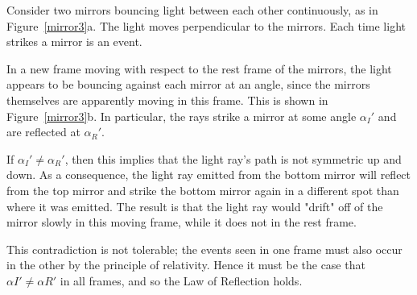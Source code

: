 \documentclass[11pt]{article}
\begin{document}
\begin{sidebox}[Lemma 1]
Consider two mirrors bouncing light between each other continuously, as in Figure~\ref{mirror3}a. The light moves perpendicular to the mirrors. Each time light strikes a mirror is an event. 

In a new frame moving with respect to the rest frame of the mirrors, the light appears to be bouncing against each mirror at an angle, since the mirrors themselves are apparently moving in this frame. This is shown in Figure~\ref{mirror3}b. In particular, the rays strike a mirror at some angle $\alpha_{I}'$ and are reflected at $\alpha_{R}'$.

If $\alpha_{I}' \neq \alpha_{R}'$, then this implies that the light ray's path is not symmetric up and down. As a consequence, the light ray emitted from the bottom mirror will reflect from the top mirror and strike the bottom mirror again in a different spot than where it was emitted. The result is that the light ray would "drift" off of the mirror slowly in this moving frame, while it does not in the rest frame.

This contradiction is not tolerable; the events seen in one frame must also occur in the other by the principle of relativity. Hence it must be the case that $\alpha{I}' \neq \alpha{R}'$ in all frames, and so the Law of Reflection holds.
\end{sidebox}
\end{document}
